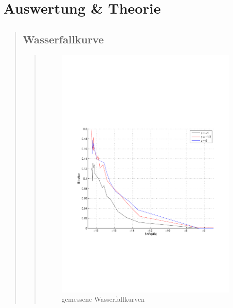 \begin{quote}
\begin{quote}
    \end{quote}
    
   
\end{quote}

\section{Auswertung \& Theorie}
\begin{quote}
    
    \subsection{Wasserfallkurve}
    
    \begin{quote}
    
    	\begin{figure}[H]
          \centering
           \includegraphics[scale=0.7, trim = 2cm 7cm 1cm 8cm, clip]{Bilder/Gemessen_Wasserfall}
            \caption{gemessene Wasserfallkurven}
          \label{fig:gemess_Wasser}
        \end{figure}
       

\end{quote}
\end{quote}

